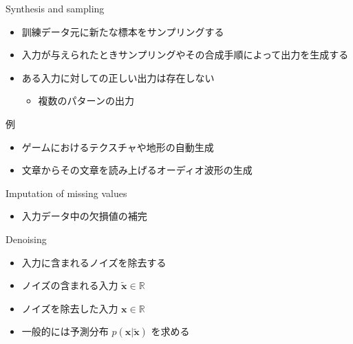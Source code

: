 \documentclass[dvipdfmx, 10pt]{beamer}
\begin{document}

\begin{frame}{Synthesis and sampling}
  \begin{itemize}
    \item 訓練データ元に新たな標本をサンプリングする
    \item 入力が与えられたときサンプリングやその合成手順によって出力を生成する
    \item ある入力に対しての正しい出力は存在しない
    \begin{itemize}
      \item 複数のパターンの出力
    \end{itemize}
  \end{itemize}
  \begin{exampleblock}{例}
    \begin{itemize}
      \item ゲームにおけるテクスチャや地形の自動生成
      \item 文章からその文章を読み上げるオーディオ波形の生成
    \end{itemize}
  \end{exampleblock}
\end{frame}


\begin{frame}{Imputation of missing values}
  \begin{itemize}
    \item 入力データ中の欠損値の補完
  \end{itemize}
\end{frame}


\begin{frame}{Denoising}
  \begin{itemize}
    \item 入力に含まれるノイズを除去する
    \item ノイズの含まれる入力 $\tilde{\bm{x}} \in \mathbb{R}$
    \item ノイズを除去した入力 $\bm{x} \in \mathbb{R}$
    \item 一般的には予測分布 $p(\bm{x}|\tilde{\bm{x}})$ を求める
  \end{itemize}
\end{frame}

\end{document}
